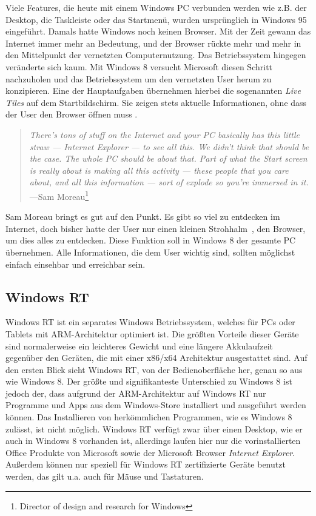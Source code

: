 \documentclass[12pt,a4paper,bibtotoc,abstracton]{scrartcl}
\begin{document}
Viele Features, die heute mit einem Windows PC verbunden werden wie z.B. der Desktop, die Taskleiste oder das Startmenü, wurden ursprünglich in Windows 95 eingeführt. Damals hatte Windows noch keinen Browser. Mit der Zeit gewann das Internet immer mehr an Bedeutung, und der Browser rückte mehr und mehr in den Mittelpunkt der vernetzten Computernutzung. Das Betriebssystem hingegen veränderte sich kaum. Mit Windows 8 versucht Microsoft diesen Schritt nachzuholen und das Betriebssystem um den vernetzten User herum zu konzipieren. Eine der Hauptaufgaben übernehmen hierbei die sogenannten \textit{Live Tiles} auf dem Startbildschirm. Sie zeigen stets aktuelle Informationen, ohne dass der User den Browser öffnen muss \citep{Pachal2012}. 

\begin{quote}
\textit{There's tons of stuff on the Internet and your PC basically has this little straw — Internet Explorer — to see all this. We didn't think that should be the case. The whole PC should be about that. Part of what the Start screen is really about is making all this activity — these people that you care about, and all this information — sort of explode so you're immersed in it.} ---Sam Moreau\footnote{Director of design and research for Windows}
\end{quote}

Sam Moreau bringt es gut auf den Punkt. Es gibt so viel zu entdecken im Internet, doch bisher hatte der User nur einen kleinen \glqq Strohhalm\grqq\ , den Browser, um dies alles zu entdecken. Diese Funktion soll in Windows 8 der gesamte PC übernehmen. Alle Informationen, die dem User wichtig sind, sollten möglichst einfach einsehbar und erreichbar sein.

\subsection{Windows RT}
\label{subsec:winRT}
Windows RT ist ein separates Windows Betriebssystem, welches für PCs oder Tablets mit ARM-Architektur optimiert ist. Die größten Vorteile dieser Geräte sind normalerweise ein leichteres Gewicht und eine längere Akkulaufzeit gegenüber den Geräten, die mit einer x86/x64 Architektur ausgestattet sind. Auf den ersten Blick sieht Windows RT, von der Bedienoberfläche her, genau so aus wie Windows 8. Der größte und signifikanteste Unterschied zu Windows 8 ist jedoch der, dass aufgrund der ARM-Architektur auf Windows RT nur Programme und Apps aus dem Windows-Store installiert und ausgeführt werden können. Das Installieren von herkömmlichen Programmen, wie es Windows 8 zulässt, ist nicht möglich. Windows RT verfügt zwar über einen Desktop, wie er auch in Windows 8 vorhanden ist, allerdings laufen hier nur die vorinstallierten Office Produkte von Microsoft sowie der Microsoft Browser \textit{Internet Explorer}. Außerdem können nur speziell für Windows RT zertifizierte Geräte benutzt werden, das gilt u.a. auch für Mäuse und Tastaturen. \citep{MicrosoftWinRT}  
 
\end{document}
